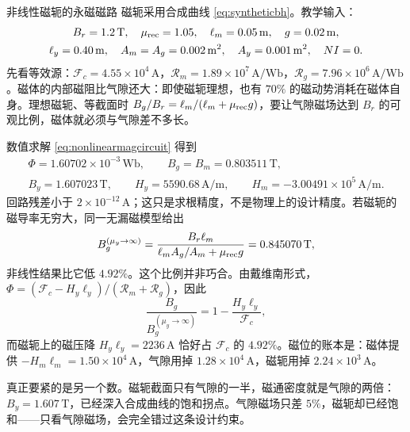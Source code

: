 \begin{example}[label=ex:lumped-pm]{非线性磁轭的永磁磁路}
磁轭采用合成曲线 \eqref{eq:syntheticbh}。教学输入：
\begin{gather*}
B_r=1.2\,\mathrm T,\quad \mu_{\rm rec}=1.05,\quad \ell_m=0.05\,\mathrm m,\quad g=0.02\,\mathrm m,\\
\ell_y=0.40\,\mathrm m,\quad A_m=A_g=0.002\,\mathrm{m^2},\quad A_y=0.001\,\mathrm{m^2},\quad NI=0 .
\end{gather*}
\solution
先看等效源：$\mathcal F_c=4.55\times10^4\,\mathrm A$，$\mathcal R_m=1.89\times10^7\,\mathrm{A/Wb}$，$\mathcal R_g=7.96\times10^6\,\mathrm{A/Wb}$。磁体的内部磁阻比气隙还大：即使磁轭理想，也有 $70\%$ 的磁动势消耗在磁体自身。理想磁轭、等截面时 $B_g/B_r=\ell_m/(\ell_m+\mu_{\rm rec}g)$，要让气隙磁场达到 $B_r$ 的可观比例，磁体就必须与气隙差不多长。

数值求解 \eqref{eq:nonlinearmagcircuit} 得到
\begin{equation*}
\begin{gathered}
\Phi=1.60702\times10^{-3}\,\mathrm{Wb},\qquad B_g=B_m=0.803511\,\mathrm T,\\
B_y=1.607023\,\mathrm T,\qquad H_y=5590.68\,\mathrm{A/m},\qquad H_m=-3.00491\times10^5\,\mathrm{A/m}.
\end{gathered}
\end{equation*}
回路残差小于 $2\times10^{-12}\,\mathrm A$；这只是求根精度，不是物理上的设计精度。若磁轭的磁导率无穷大，同一无漏磁模型给出
\begin{equation*}
B_g^{(\mu_y\to\infty)}=\frac{B_r\ell_m}{\ell_mA_g/A_m+\mu_{\rm rec}g}=0.845070\,\mathrm T,
\end{equation*}
非线性结果比它低 $4.92\%$。这个比例并非巧合。由戴维南形式，$\Phi=(\mathcal F_c-H_y\ell_y)/(\mathcal R_m+\mathcal R_g)$，因此
\begin{equation*}
\frac{B_g}{B_g^{(\mu_y\to\infty)}}=1-\frac{H_y\ell_y}{\mathcal F_c},
\end{equation*}
而磁轭上的磁压降 $H_y\ell_y=2236\,\mathrm A$ 恰好占 $\mathcal F_c$ 的 $4.92\%$。磁位的账本是：磁体提供 $-H_m\ell_m=1.50\times10^4\,\mathrm A$，气隙用掉 $1.28\times10^4\,\mathrm A$，磁轭用掉 $2.24\times10^3\,\mathrm A$。

真正要紧的是另一个数。磁轭截面只有气隙的一半，磁通密度就是气隙的两倍：$B_y=1.607\,\mathrm T$，已经深入合成曲线的饱和拐点。气隙磁场只差 $5\%$，磁轭却已经饱和——只看气隙磁场，会完全错过这条设计约束。
\end{example}

